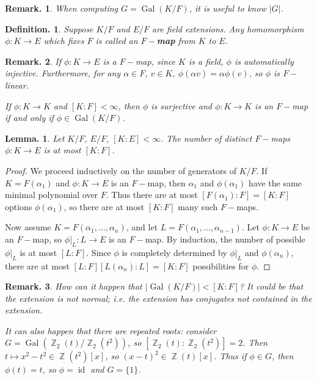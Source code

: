\documentclass[11pt, a4paper]{memoir}
\DeclareMathOperator{\Z}{{\mathbb{Z}}}
\newcommand{\mbf}[1]{{\boldmath\bfseries #1}}
\theoremstyle{change}
\newtheorem{lemma}[theorem]{Lemma.}
\theoremstyle{plain}
\theoremstyle{nonumberplain}
\newtheorem{definition}{Definition.}
\newtheorem{remark}{Remark.}
\newtheorem{proof}{Proof}
\DeclareMathOperator{\Gal}{Gal}
\DeclareMathOperator{\id}{id}
\numberwithin{equation}{section}
\begin{document}
\begin{remark}
    When computing $G=\Gal(K/F)$, it is useful to know $|G|$.
\end{remark}
\begin{definition}
    Suppose $K/F$ and $E/F$ are field extensions.
    Any homomorphism $\phi:K\to E$ which fixes $F$ is called an \mbf{$F-$map} from $K$ to $E$.
\end{definition}
\begin{remark}
    If $\phi:K\to E$ is a $F-$map, since $K$ is a field, $\phi$ is automatically injective.
    Furthermore, for any $\alpha\in F$, $v\in K$, $\phi(\alpha v)=\alpha\phi(v)$, so $\phi$ is $F-$linear.

    If $\phi:K\to K$ and $[K:F]<\infty$, then $\phi$ is surjective and $\phi:K\to K$ is an $F-$map if and only if $\phi\in\Gal(K/F)$.
\end{remark}
\begin{lemma}
    Let $K/F$, $E/F$, $[K:E]<\infty$.
    The number of distinct $F-$maps $\phi:K\to E$ is at most $[K:F]$.
\end{lemma}
\begin{proof}
    We proceed inductively on the number of generators of $K/F$.
    If $K=F(\alpha_1)$ and $\phi:K\to E$ is an $F-$map, then $\alpha_1$ and $\phi(\alpha_1)$ have the same minimal polynomial over $F$.
    Thus there are at most $[F(\alpha_1):F]=[K:F]$ options $\phi(\alpha_1)$, so there are at most $[K:F]$ many such $F-$maps.

    Now assume $K=F(\alpha_1,\ldots,\alpha_n)$, and let $L=F(\alpha_1,\ldots,\alpha_{n-1})$.
    Let $\phi:K\to E$ be an $F-$map, so $\phi|_L:L\to E$ is an $F-$map.
    By induction, the number of possible $\phi|_L$ is at most $[L:F]$.
    Since $\phi$ is completely determined by $\phi|_L$ and $\phi(\alpha_n)$, there are at most $[L:F][L(\alpha_n):L]=[K:F]$ possibilities for $\phi$.
\end{proof}
\begin{remark}
    How can it happen that $|\Gal(K/F)|<[K:F]$?
    It could be that the extension is not normal; i.e. the extension has conjugates not contained in the extension.

    It can also happen that there are repeated roots: consider $G=\Gal(\Z_2(t)/\Z_2(t^2))$, so $[\Z_2(t):\Z_2(t^2)]=2$.
    Then $t\mapsto x^2-t^2\in\Z(t^2)[x]$, so $(x-t)^2\in\Z(t)[x]$.
    Thus if $\phi\in G$, then $\phi(t)=t$, so $\phi=\id$ and $G=\{1\}$.
\end{remark}
\end{document}
